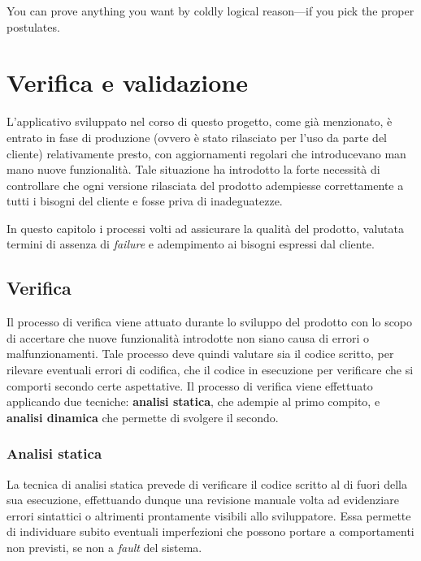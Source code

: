 

\begin{savequote}[75mm]
    You can prove anything you want by coldly logical reason---if you pick the proper postulates.
\end{savequote}

\chapter{Verifica e validazione}
\label{chap5}
L'applicativo sviluppato nel corso di questo progetto, come già menzionato, è entrato in fase di produzione (ovvero è stato rilasciato per l'uso da parte del cliente) relativamente presto, con aggiornamenti regolari che introducevano man mano nuove funzionalità. Tale situazione ha introdotto la forte necessità di controllare che ogni versione rilasciata del prodotto adempiesse correttamente a tutti i bisogni del cliente e fosse priva di inadeguatezze.

In questo capitolo i processi volti ad assicurare la qualità del prodotto, valutata termini di assenza di \textit{failure} e adempimento ai bisogni espressi dal cliente.

\section{Verifica}
Il processo di verifica viene attuato durante lo sviluppo del prodotto con lo scopo di accertare che nuove funzionalità introdotte non siano causa di errori o malfunzionamenti. Tale processo deve quindi valutare sia il codice scritto, per rilevare eventuali errori di codifica, che il codice in esecuzione per verificare che si comporti secondo certe aspettative. Il processo di verifica viene effettuato applicando due tecniche: \textbf{analisi statica}, che adempie al primo compito, e \textbf{analisi dinamica} che permette di svolgere il secondo.
\subsection{Analisi statica}
La tecnica di analisi statica prevede di verificare il codice scritto al di fuori della sua esecuzione, effettuando dunque una revisione manuale volta ad evidenziare errori sintattici o altrimenti prontamente visibili allo sviluppatore. Essa permette di individuare subito eventuali imperfezioni che possono portare a comportamenti non previsti, se non a \textit{fault} del sistema.

